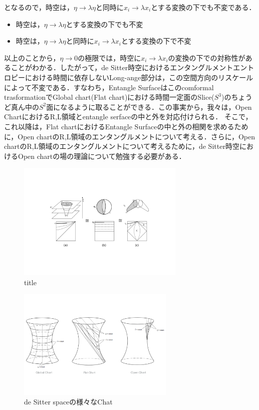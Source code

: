 となるので，時空は，$\eta\to\lambda\eta$と同時に$x_{i}\to\lambda x_{i}$とする変換の下でも不変である．
\begin{itemize}
  \item{時空は，$\eta\to\lambda\eta$とする変換の下でも不変}
  \item{時空は，$\eta\to\lambda\eta$と同時に$x_{i}\to\lambda x_{i}$とする変換の下で不変}
\end{itemize}
以上のことから，$\eta\to0$の極限では，時空に$x_{i}\to\lambda x_{i}$の変換の下での対称性があることがわかる．したがって，de Sitter時空におけるエンタングルメントエントロピーにおける時間に依存しないLong-ange部分は，この空間方向のリスケールによって不変である．すなわち，Entangle Surfaceはこのcomformal trasformationでGlobal chart(Flat chart)における時間一定面のSlice($S^3$)のちょうど真ん中の$S^2$面になるように取ることができる．この事実から，我々は，Open ChartにおけるR,L領域とentangle serfaceの中と外を対応付けられる．
そこで，これ以降は，Flat chartにおけるEntangle Surfaceの中と外の相関を求めるために，Open chartのR,L領域のエンタングルメントについて考える．さらに，Open chartのR,L領域のエンタングルメントについて考えるために，de Sitter時空におけるOpen chartの場の理論について勉強する必要がある．


  \begin{figure}[H]
    \begin{center}
    \includegraphics[width=8cm,angle=270]{de.pdf}
    \caption{title}
    \end{center}
  \end{figure}

  \begin{figure}[H]
    \begin{center}
    \includegraphics[width=7.5cm,angle=270]{Web.pdf}
    \caption{de Sitter spaceの様々なChat}
    \label{vchart}
    \end{center}
  \end{figure}

